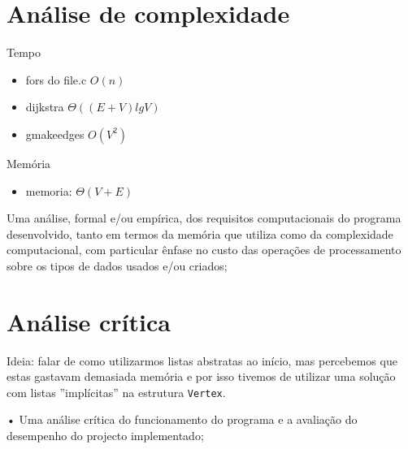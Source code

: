 \documentclass[a4paper, 18pt]{article}
\begin{document}
\section{Análise de complexidade}
	\par
	Tempo
	\begin{itemize}
		\item fors do file.c $O(n)$
		\item dijkstra $\Theta((E+V) lg V)$
		\item g\textunderscore make\textunderscore edges $O(V^2)$
	\end{itemize}
	\par
	Memória
	\begin{itemize}
		\item memoria: $\Theta(V + E)$
	\end{itemize}
	\par
	Uma análise, formal e/ou empírica, dos requisitos computacionais do programa desenvolvido, tanto em termos da memória que utiliza como da complexidade computacional, com particular ênfase no custo das operações de processamento sobre os tipos de dados usados e/ou criados;

\section{Análise crítica}
	\par
	Ideia: falar de como utilizarmos listas abstratas ao início, mas percebemos que estas gastavam demasiada memória e por isso tivemos de utilizar uma solução com listas ''implícitas'' na estrutura \texttt{Vertex}.
	\par
• Uma análise crítica do funcionamento do programa e a avaliação do desempenho
do projecto implementado;
\end{document}
